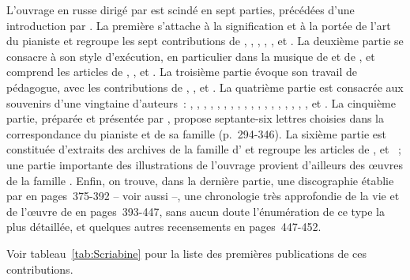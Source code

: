 L'ouvrage en russe dirigé par \citet{Scriabine} est scindé en sept parties,
précédées d'une introduction par \citeauthor{ScriabineNikolaieva}.
La première s'attache à la signification et à la portée de l'art du pianiste
et regroupe les sept contributions de \citeauthor{Vedernikov13},
\citeauthor{Smirnov13}, \citeauthor{Orlovsky13}, \citeauthor{Spiridonova13},
\citeauthor{Sokolov13}, \citeauthor{Kuznetsov13} et \citeauthor{Yudina13}.
La deuxième partie se consacre à son style d'exécution, en particulier dans
la musique de \Scriabine{} et de \Schumann{}, et comprend les articles de
\citeauthor{Nikolaiev13}, \citeauthor{Alekseiev13a}, \citeauthor{Zinger13}
et \citeauthor{Merkoulov13}.
La troisième partie évoque son travail de pédagogue, avec les contributions
de \citeauthor{Scriabine13a}, \citeauthor{Zhukova13},
\citeauthor{Salnikov13} et \citeauthor{Eshpai13}.
La quatrième partie est consacrée aux souvenirs d'une vingtaine d'auteurs~:
\citeauthor{Sofronitsky13a}, \citeauthor{Sofronitsky13b},
\citeauthor{Sofronitskaya13}, \citeauthor{Kogan13},
\citeauthor{Berkovskaya13}, \citeauthor{Askoldova13},
\citeauthor{Barinova13}, \citeauthor{Pasternak13},
\citeauthor{Alekseiev13b}, \citeauthor{Gornostaieva13},
\citeauthor{Tolstoi13}, \citeauthor{Paperno13}, \citeauthor{Kondratiev13},
\citeauthor{Muravliov13}, \citeauthor{Cherkasov13}, \citeauthor{Zhukov13},
\citeauthor{Ivanov13}, \citeauthor{Pokrovsky13}, \citeauthor{Savostiouk13}
et \citeauthor{Safonov13}.
La cinquième partie, préparée et présentée par \citeauthor{Scriabine13b},
propose septante-six lettres choisies dans la correspondance du pianiste et
de sa famille (p.~294-346).
La sixième partie est constituée d'extraits des archives de la famille
d'\EVizel{} et regroupe les articles de \citeauthor{Vizel13a},
\citeauthor{Vizel13b} et \citeauthor{Vizel13c}~; une partie importante des
illustrations de l'ouvrage provient d'ailleurs des œuvres de la famille
\Vizel{}.
Enfin, on trouve, dans la dernière partie, une discographie établie par
\INikonovich{} en pages~375-392 -- voir aussi \citet{Nikonovich11} --, une
chronologie très approfondie de la vie et de l'œuvre de \VSofronitsky{} en
pages~393-447, sans aucun doute l'énumération de ce type la plus détaillée,
et quelques autres recensements en pages~447-452.

Voir tableau~\ref{tab:Scriabine} pour la liste des premières publications
de ces contributions.

